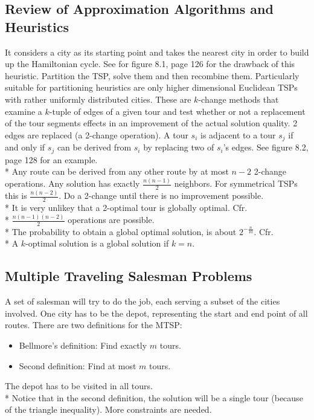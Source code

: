 \documentclass[12pt]{book}
\newcounter{subsubsubsection}[subsubsection]
\begin{document}
\subsection{Review of Approximation Algorithms and Heuristics}
It considers a city as its starting point and takes the nearest city in order to build up the Hamiltonian cycle. See for figure 8.1, page 126 for the drawback of this heuristic.
Partition the TSP, solve them and then recombine them. Particularly suitable for partitioning heuristics are only higher dimensional Euclidean TSPs with rather uniformly distributed cities.
These are $k$-change methods that examine a $k$-tuple of edges of a given tour and test whether or not a replacement of the tour segments effects in an improvement of the actual solution quality.
2 edges are replaced (a 2-change operation). A tour $s_i$ is adjacent to a tour $s_j$ if and only if $s_j$ can be derived from $s_i$ by replacing two of $s_i$'s edges. See figure 8.2, page 128 for an example.\\*
Any route can be derived from any other route by at most $n-2$ 2-change operations. Any solution has exactly $\frac{n(n-1)}{2}$ neighbors. For symmetrical TSPs this is $\frac{n(n-2)}{2}$. Do a 2-change until there is no improvement possible.\\*
It is very unlikey that a 2-optimal tour is globally optimal.
Cfr.\\*
$\frac{n(n-1)(n-2)}{2}$ operations are possible.\\*
The probability to obtain a global optimal solution, is about $2^{-\frac{n}{10}}$.
Cfr.\\*
A $k$-optimal solution is a global solution if $k = n$.
\subsection{Multiple Traveling Salesman Problems}
A set of salesman will try to do the job, each serving a subset of the cities involved. One city has to be the depot, representing the start and end point of all routes. There are two definitions for the MTSP:
\begin{itemize}
\item Bellmore's definition: Find exactly $m$ tours.
\item Second definition: Find at most $m$ tours.
\end{itemize}
The depot has to be visited in all tours.\\*
Notice that in the second definition, the solution will be a single tour (because of the triangle inequality). More constraints are needed.
\end{document}
